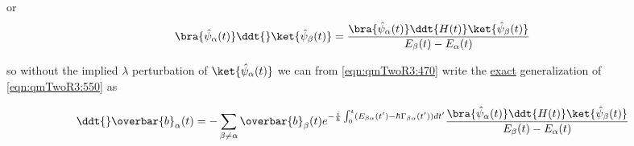 {or
\begin{equation}\label{eqn:qmTwoR3:650}
\bra{\hat{\psi}_\alpha(t)}
\ddt{}\ket{\hat{\psi}_\beta(t)} 
=
\frac{
\bra{\hat{\psi}_\alpha(t)}
\ddt{H(t)} \ket{\hat{\psi}_\beta(t)} 
}
{E_\beta(t) - E_\alpha(t)}
\end{equation}

so without the implied $\lambda$ perturbation of $\ket{\hat{\psi}_\alpha(t)}$ we can from \ref{eqn:qmTwoR3:470} write the \underline{exact} generalization of \ref{eqn:qmTwoR3:550} as

\begin{equation}\label{eqn:qmTwoR3:470b}
\ddt{}\overbar{b}_\alpha(t)
=
-\sum_{\beta \ne \alpha} \overbar{b}_\beta(t)
e^{-\frac{i}{\hbar} \int_0^t (E_{\beta\alpha}(t') - \hbar \Gamma_{\beta\alpha}(t')) dt'}
\frac{
\bra{\hat{\psi}_\alpha(t)}
\ddt{H(t)} \ket{\hat{\psi}_\beta(t)} 
}
{E_\beta(t) - E_\alpha(t)}
\end{equation}

}

